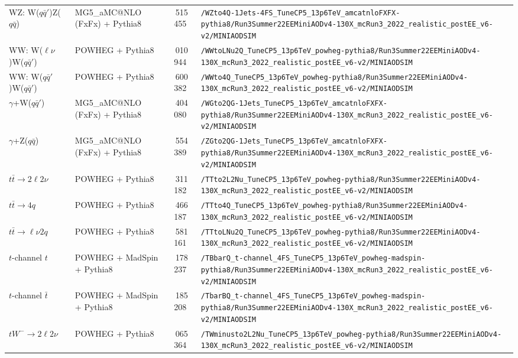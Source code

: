 \begin{landscape}
\begin{longtable}{@{}>{\raggedright\arraybackslash}p{3.2cm}>{\raggedright\arraybackslash}p{3.6cm}>{\raggedleft\arraybackslash}p{1.6cm}>{\raggedright\arraybackslash}p{13.5cm}@{}}
WZ: W($q\bar q'$)Z($q\bar q$) & MG5\_aMC@NLO (FxFx) + Pythia8 & 1\,515\,455 & \nolinkurl{/WZto4Q-1Jets-4FS_TuneCP5_13p6TeV_amcatnloFXFX-pythia8/Run3Summer22EEMiniAODv4-130X_mcRun3_2022_realistic_postEE_v6-v2/MINIAODSIM} \\
WW: W($\ell\nu$)W($q\bar q'$) & POWHEG + Pythia8 & 94\,010\,944 & \nolinkurl{/WWtoLNu2Q_TuneCP5_13p6TeV_powheg-pythia8/Run3Summer22EEMiniAODv4-130X_mcRun3_2022_realistic_postEE_v6-v2/MINIAODSIM} \\
WW: W($q\bar q'$)W($q\bar q'$) & POWHEG + Pythia8 & 100\,600\,382 & \nolinkurl{/WWto4Q_TuneCP5_13p6TeV_powheg-pythia8/Run3Summer22EEMiniAODv4-130X_mcRun3_2022_realistic_postEE_v6-v2/MINIAODSIM} \\
$\gamma$+W($q\bar q'$) & MG5\_aMC@NLO (FxFx) + Pythia8 & 16\,404\,080 & \nolinkurl{/WGto2QG-1Jets_TuneCP5_13p6TeV_amcatnloFXFX-pythia8/Run3Summer22EEMiniAODv4-130X_mcRun3_2022_realistic_postEE_v6-v2/MINIAODSIM} \\
$\gamma$+Z($q\bar q$) & MG5\_aMC@NLO (FxFx) + Pythia8 & 15\,554\,389 & \nolinkurl{/ZGto2QG-1Jets_TuneCP5_13p6TeV_amcatnloFXFX-pythia8/Run3Summer22EEMiniAODv4-130X_mcRun3_2022_realistic_postEE_v6-v2/MINIAODSIM} \\
$t\bar t\to 2\ell2\nu$ & POWHEG + Pythia8 & 74\,311\,182 & \nolinkurl{/TTto2L2Nu_TuneCP5_13p6TeV_powheg-pythia8/Run3Summer22EEMiniAODv4-130X_mcRun3_2022_realistic_postEE_v6-v2/MINIAODSIM} \\
$t\bar t\to 4q$ & POWHEG + Pythia8 & 179\,466\,187 & \nolinkurl{/TTto4Q_TuneCP5_13p6TeV_powheg-pythia8/Run3Summer22EEMiniAODv4-130X_mcRun3_2022_realistic_postEE_v6-v2/MINIAODSIM} \\
$t\bar t\to \ell\nu 2q$ & POWHEG + Pythia8 & 265\,581\,161 & \nolinkurl{/TTtoLNu2Q_TuneCP5_13p6TeV_powheg-pythia8/Run3Summer22EEMiniAODv4-130X_mcRun3_2022_realistic_postEE_v6-v2/MINIAODSIM} \\
$t$-channel $t$ & POWHEG + MadSpin + Pythia8 & 10\,178\,237 & \nolinkurl{/TBbarQ_t-channel_4FS_TuneCP5_13p6TeV_powheg-madspin-pythia8/Run3Summer22EEMiniAODv4-130X_mcRun3_2022_realistic_postEE_v6-v2/MINIAODSIM} \\
$t$-channel $\bar t$ & POWHEG + MadSpin + Pythia8 & 5\,185\,208 & \nolinkurl{/TbarBQ_t-channel_4FS_TuneCP5_13p6TeV_powheg-madspin-pythia8/Run3Summer22EEMiniAODv4-130X_mcRun3_2022_realistic_postEE_v6-v2/MINIAODSIM} \\
$tW^-\to 2\ell2\nu$ & POWHEG + Pythia8 & 8\,065\,364 & \nolinkurl{/TWminusto2L2Nu_TuneCP5_13p6TeV_powheg-pythia8/Run3Summer22EEMiniAODv4-130X_mcRun3_2022_realistic_postEE_v6-v2/MINIAODSIM} \\

\end{longtable}
\end{landscape}
